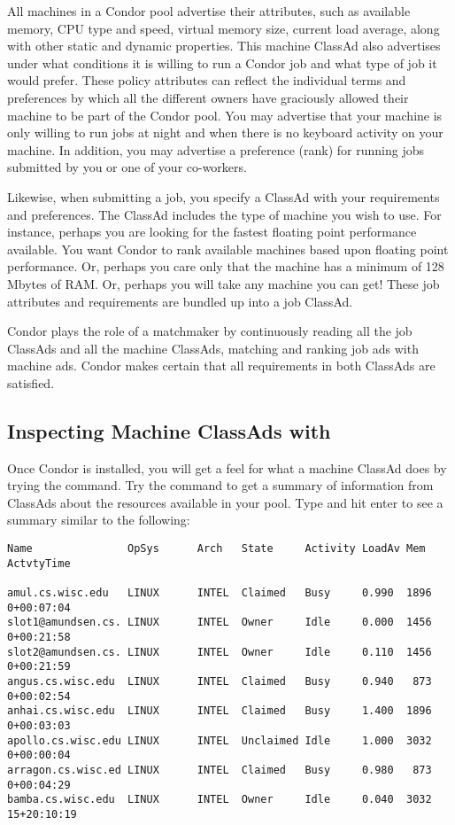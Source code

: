 All machines in a Condor pool advertise their attributes,
such as
available memory, CPU type and speed, virtual memory size, current
load average, along with other static and dynamic properties.
This machine ClassAd
also advertises under what conditions it is
willing to run a Condor job and what type of job it would prefer. These
policy attributes can reflect the individual terms and preferences by
which all the different owners have graciously allowed their machine to
be part of the Condor pool. 
You may
advertise that your machine is only willing to run jobs at night
and when there is no keyboard activity on your machine.
In addition, you may
advertise a preference (rank) for running jobs submitted by you
or one of your co-workers. 

Likewise, when submitting a job, you specify a ClassAd with
your requirements and preferences.
The ClassAd
includes the
type of machine you  wish to use. For instance, perhaps you are
looking for the fastest floating point performance available.
You want Condor to rank available machines
based upon floating point performance. Or, perhaps you
care only that the machine has a minimum of 128 Mbytes of RAM.
Or, perhaps you will
take any machine you can get! These job attributes and requirements
are bundled up into a job ClassAd.

Condor plays the role of a matchmaker by continuously reading
all the job ClassAds and all the machine ClassAds, 
matching and ranking job ads with machine ads.
Condor makes certain that all
requirements in both ClassAds are satisfied. 

\subsection{Inspecting Machine ClassAds with }

Once Condor is installed,
you will get a feel for what
a machine ClassAd does by trying
the  command.
Try the  command to get
a summary of information from
ClassAds about the resources available in your pool.
Type  and hit enter to see a summary 
similar to the following:
\footnotesize
\begin{verbatim}
Name               OpSys      Arch   State     Activity LoadAv Mem   ActvtyTime

amul.cs.wisc.edu   LINUX      INTEL  Claimed   Busy     0.990  1896  0+00:07:04
slot1@amundsen.cs. LINUX      INTEL  Owner     Idle     0.000  1456  0+00:21:58
slot2@amundsen.cs. LINUX      INTEL  Owner     Idle     0.110  1456  0+00:21:59
angus.cs.wisc.edu  LINUX      INTEL  Claimed   Busy     0.940   873  0+00:02:54
anhai.cs.wisc.edu  LINUX      INTEL  Claimed   Busy     1.400  1896  0+00:03:03
apollo.cs.wisc.edu LINUX      INTEL  Unclaimed Idle     1.000  3032  0+00:00:04
arragon.cs.wisc.ed LINUX      INTEL  Claimed   Busy     0.980   873  0+00:04:29
bamba.cs.wisc.edu  LINUX      INTEL  Owner     Idle     0.040  3032 15+20:10:19
\end{verbatim}
\normalsize
\Dots 


